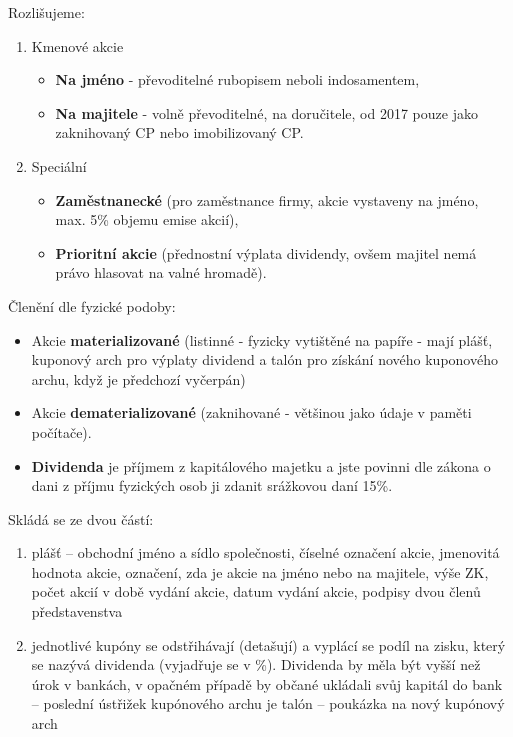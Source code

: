 Rozlišujeme:
\begin{enumerate}
    \item Kmenové akcie
        \begin{itemize}
            \item \textbf{Na jméno} - převoditelné rubopisem neboli indosamentem,
            \item \textbf{Na majitele} - volně převoditelné, na doručitele, od 2017 pouze jako zaknihovaný CP nebo imobilizovaný CP.
        \end{itemize}
    \item Speciální
        \begin{itemize}
            \item \textbf{Zaměstnanecké} (pro zaměstnance firmy, akcie vystaveny na jméno, max. 5\% objemu emise akcií),
            \item \textbf{Prioritní akcie} (přednostní výplata dividendy, ovšem majitel nemá právo hlasovat na valné hromadě).    
        \end{itemize}
\end{enumerate}

Členění dle fyzické podoby:
\begin{itemize}
    \item  Akcie \textbf{materializované} (listinné - fyzicky vytištěné na papíře - mají plášť, kuponový arch pro výplaty dividend a talón pro získání nového kuponového archu, když je předchozí vyčerpán)
    \item  Akcie \textbf{dematerializované} (zaknihované - většinou jako údaje v paměti počítače).
    \item  \textbf{Dividenda} je příjmem z kapitálového majetku a jste povinni dle zákona o dani z příjmu fyzických osob ji zdanit srážkovou daní 15\%.
\end{itemize}

Skládá se ze dvou částí:
\begin{enumerate}
    \item plášť -- obchodní jméno a sídlo společnosti, číselné označení akcie, jmenovitá hodnota akcie, označení, zda je akcie na jméno nebo na majitele, výše ZK, počet akcií v době vydání akcie, datum vydání akcie, podpisy dvou členů představenstva
    \item jednotlivé kupóny se odstřihávají (detašují) a vyplácí se podíl na zisku, který se nazývá dividenda (vyjadřuje se v \%). Dividenda by měla být vyšší než úrok v bankách, v opačném případě by občané ukládali svůj kapitál do bank -- poslední ústřižek kupónového archu je talón -- poukázka na nový kupónový arch
\end{enumerate}


